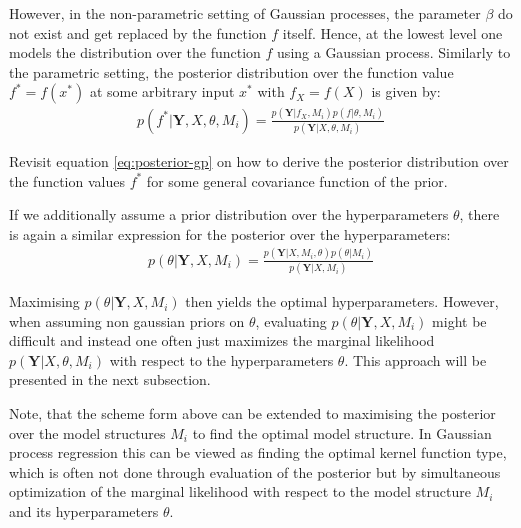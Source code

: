 However, in the non-parametric setting of Gaussian processes, the parameter $\beta$ do not exist and get replaced by
the function $f$ itself.
Hence, at the lowest level one models the distribution over the function $f$ using a Gaussian process.
Similarly to the parametric setting, the posterior distribution over the function value
$f^{\ast} = f(x^{\ast})$ at some arbitrary input $x^{\ast}$ with $f_X = f(X)$ is given by:
\begin{gather*}
    p(f^{\ast} | \mathbf{Y}, X, \theta, M_i) = \frac{p( \mathbf{Y}| f_X,
        M_i)p(f| \theta, M_i)}{p(\mathbf{Y}|X, \theta, M_i)}
\end{gather*}

Revisit equation \ref{eq:posterior-gp} on how to derive the posterior distribution
over the function values $f^{\ast}$ for some general covariance function of the prior.

If we additionally assume a prior distribution over the hyperparameters $\theta$,
there is again a similar expression for the posterior over the hyperparameters:
\begin{gather*}
    p(\theta | \mathbf{Y}, X, M_i) = \frac{p( \mathbf{Y}| X,M_i, \theta)
        p(\theta| M_i)}{p(\mathbf{Y}|X, M_i)}
\end{gather*}

Maximising $p(\theta | \mathbf{Y}, X, M_i)$ then yields the
optimal hyperparameters. However, when assuming non gaussian priors on $\theta$,
evaluating $p(\theta | \mathbf{Y}, X, M_i)$ might
be difficult and instead one often just maximizes the marginal likelihood
$p(\mathbf{Y}|X, \theta, M_i)$ with respect to the hyperparameters $\theta$. This approach
will be presented in the next subsection.


Note, that the scheme form above can be extended to maximising the posterior over the model structures $M_i$
to find the optimal model structure.
In Gaussian process regression this can be viewed as finding the optimal kernel function type,
which is often not done through evaluation of the posterior but
by simultaneous optimization of the marginal likelihood with respect to the model
structure $M_i$ and its hyperparameters $\theta$.



